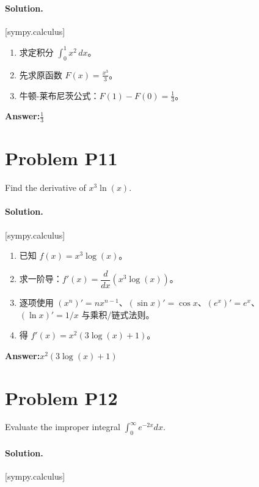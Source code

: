 \documentclass[11pt,a4paper]{ctexart}
\newcommand{\solvertag}[1]{{\footnotesize\color{gray}\textsf{[#1]}}}
\begin{document}
\paragraph{Solution.} \solvertag{sympy.calculus} 

\begin{enumerate}[leftmargin=*]
  \item 求定积分 $\displaystyle\int_{0}^{1} x^{2}\, dx$。
  \item 先求原函数 $F(x) = \frac{x^{3}}{3}$。
  \item 牛顿-莱布尼茨公式：$F(1) - F(0) = \frac{1}{3}$。
\end{enumerate}

\noindent\textbf{Answer:}\quad $\frac{1}{3}$

\medskip

\section*{Problem P11}
Find the derivative of $x^{3}\ln(x)$.

\paragraph{Solution.} \solvertag{sympy.calculus} 

\begin{enumerate}[leftmargin=*]
  \item 已知 $f(x) = x^{3} \log{\left(x \right)}$。
  \item 求一阶导：$f'(x) = \dfrac{d}{dx}\left(x^{3} \log{\left(x \right)}\right)$。
  \item 逐项使用 $(x^n)' = nx^{n-1}$、$(\sin x)' = \cos x$、$(e^x)' = e^x$、$(\ln x)' = 1/x$ 与乘积/链式法则。
  \item 得 $f'(x) = x^{2} \left(3 \log{\left(x \right)} + 1\right)$。
\end{enumerate}

\noindent\textbf{Answer:}\quad $x^{2} \left(3 \log{\left(x \right)} + 1\right)$

\medskip

\section*{Problem P12}
Evaluate the improper integral $\int_0^{\infty} e^{-2x} dx$.

\paragraph{Solution.} \solvertag{sympy.calculus} 
\end{document}
